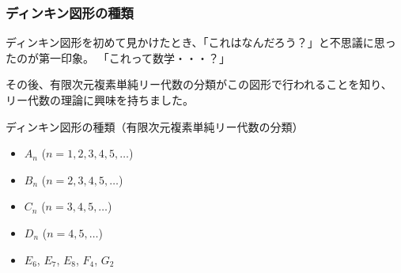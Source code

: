 \documentclass{beamer}
\begin{document}
\begin{frame}
    \frametitle{ディンキン図形の種類}

    ディンキン図形を初めて見かけたとき、「これはなんだろう？」と不思議に思ったのが第一印象。
    「これって数学・・・？」

    \bigskip

    その後、有限次元複素単純リー代数の分類がこの図形で行われることを知り、
    リー代数の理論に興味を持ちました。

    \bigskip

    \begin{block}{ディンキン図形の種類（有限次元複素単純リー代数の分類）}
        \begin{itemize}
            \item \(A_n\) (\(n = 1,2,3,4,5,\dots\))
            \item \(B_n\) (\(n = 2,3,4,5,\dots\))
            \item \(C_n\) (\(n = 3,4,5,\dots\))
            \item \(D_n\) (\(n = 4,5,\dots\))
            \item \(E_6\), \(E_7\), \(E_8\), \(F_4\), \(G_2\)
        \end{itemize}
    \end{block}
\end{frame}
\end{document}
